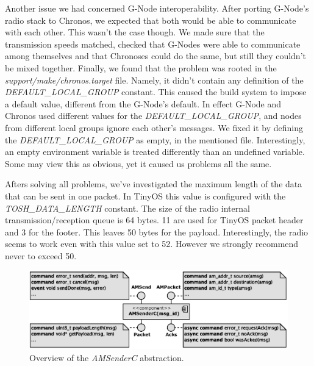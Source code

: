 Another issue we had concerned G-Node interoperability. After porting G-Node's radio stack to Chronos, we expected that both would be able to communicate with each other. This wasn't the case though. We made sure that the transmission speeds matched, checked that G-Nodes were able to communicate among themselves and that Chronoses could do the same, but still they couldn't be mixed together. Finally, we found that the problem was rooted in the \emph{support/make/chronos.target} file. Namely, it didn't contain any definition of the \emph{DEFAULT\_LOCAL\_GROUP} constant. This caused the build system to impose a default value, different from the G-Node's default. In effect G-Node and Chronos used different values for the \emph{DEFAULT\_LOCAL\_GROUP}, and nodes from different local groups ignore each other's messages. We fixed it by defining the \emph{DEFAULT\_LOCAL\_GROUP} as empty, in the mentioned file. Interestingly, an empty environment variable is treated differently than an undefined variable. Some may view this as obvious, yet it caused us problems all the same.

Afters solving all problems, we've investigated the maximum length of the data that can be sent in one packet. In TinyOS this value is configured with the \emph{TOSH\_DATA\_LENGTH} constant. The size of the radio internal transmission/reception queue is 64 bytes. 11 are used for TinyOS packet header and 3 for the footer. This leaves 50 bytes for the payload. Interestingly, the radio seems to work even with this value set to 52. However we strongly recommend never to exceed 50.

\begin{figure}[h]
  \centering
  \includegraphics[width=1.0\textwidth]{diagrams/am_sender_c.eps}
  \caption{Overview of the \emph{AMSenderC} abstraction.}
  \label{fig:am_sender_c}
\end{figure}

